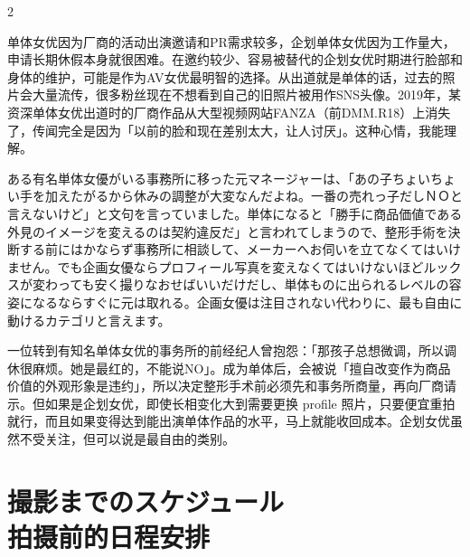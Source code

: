 \documentclass[12pt,UTF8]{ctexbook}
\begin{document}
\begin{paracol}{2}
\switchcolumn

单体女优因为厂商的活动出演邀请和PR需求较多，企划单体女优因为工作量大，申请长期休假本身就很困难。在邀约较少、容易被替代的企划女优时期进行脸部和身体的维护，可能是作为AV女优最明智的选择。从出道就是单体的话，过去的照片会大量流传，很多粉丝现在不想看到自己的旧照片被用作SNS头像。2019年，某资深单体女优出道时的厂商作品从大型视频网站FANZA（前DMM.R18）上消失了，传闻完全是因为「以前的脸和现在差别太大，让人讨厌」。这种心情，我能理解。

\switchcolumn*

ある有名単体女優がいる事務所に移った元マネージャーは、「あの子ちょいちょい手を加えたがるから休みの調整が大変なんだよね。一番の売れっ子だしＮＯと言えないけど」と文句を言っていました。単体になると「勝手に商品価値である外見のイメージを変えるのは契約違反だ」と言われてしまうので、整形手術を決断する前にはかならず事務所に相談して、メーカーへお伺いを立てなくてはいけません。でも企画女優ならプロフィール写真を変えなくてはいけないほどルックスが変わっても安く撮りなおせばいいだけだし、単体ものに出られるレベルの容姿になるならすぐに元は取れる。企画女優は注目されない代わりに、最も自由に動けるカテゴリと言えます。

\switchcolumn

一位转到有知名单体女优的事务所的前经纪人曾抱怨：「那孩子总想微调，所以调休很麻烦。她是最红的，不能说NO」。成为单体后，会被说「擅自改变作为商品价值的外观形象是违约」，所以决定整形手术前必须先和事务所商量，再向厂商请示。但如果是企划女优，即使长相变化大到需要更换 profile 照片，只要便宜重拍就行，而且如果变得达到能出演单体作品的水平，马上就能收回成本。企划女优虽然不受关注，但可以说是最自由的类别。

\end{paracol}

\section{撮影までのスケジュール\\拍摄前的日程安排}
\end{document}
